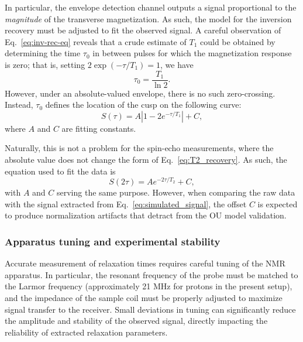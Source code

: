 \documentclass[%
 reprint,
 amsmath,amssymb,
 aps,
]{revtex4-2}
\begin{document}
In particular, the envelope detection channel outputs a signal proportional to the \textit{magnitude} of the transverse magnetization. As such, the model for the inversion recovery must be adjusted to fit the observed signal. A careful observation of Eq.~\ref{eq:inv-rec-eq} reveals that a crude estimate of $T_1$ could be obtained by determining the time $\tau_0$ in between pulses for which the magnetization response is zero; that is, setting $2\exp(-\tau/T_1)=1$, we have
\begin{equation*}
    \tau_0 = \frac{T_1}{\ln{2}}.
\end{equation*}
However, under an absolute-valued envelope, there is no such zero-crossing. Instead, $\tau_0$ defines the location of the cusp on the following curve:
\begin{equation}
    S(\tau) = A\left\lvert 1-2e^{-\tau/T_1}\right\rvert + C,
    \label{eq:inv-rec-model}
\end{equation}
where $A$ and $C$ are fitting constants.

Naturally, this is not a problem for the spin-echo measurements, where the absolute value does not change the form of Eq.~\ref{eq:T2_recovery}. As such, the equation used to fit the data is
\begin{equation}
    S(2\tau) = Ae^{-2\tau/T_2} + C,
    \label{eq:spin-echo-model}
\end{equation}
with $A$ and $C$ serving the same purpose. However, when comparing the raw data with the signal extracted from Eq.~\ref{eq:simulated_signal}, the offset $C$ is expected to produce normalization artifacts that detract from the OU model validation.

\subsubsection{Apparatus tuning and experimental stability}
\label{sec:tuning}
Accurate measurement of relaxation times requires careful tuning of the NMR apparatus. In particular, the resonant frequency of the probe must be matched to the Larmor frequency (approximately 21 MHz for protons in the present setup), and the impedance of the sample coil must be properly adjusted to maximize signal transfer to the receiver. Small deviations in tuning can significantly reduce the amplitude and stability of the observed signal, directly impacting the reliability of extracted relaxation parameters.
\end{document}
